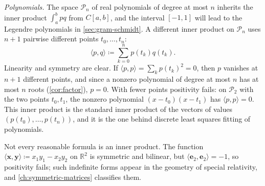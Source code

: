 \emph{Polynomials.} The space $\mathcal P_n$ of real polynomials of degree at most $n$ inherits the inner product $\int_a^bpq$ from $C[a,b]$, and the interval $[-1,1]$ will lead to the Legendre polynomials in \cref{sec:gram-schmidt}. A different inner product on $\mathcal P_n$ uses $n+1$ pairwise different points $t_0,\ldots,t_n$:
\[
\langle p,q\rangle\coloneqq\sum_{k=0}^np(t_k)q(t_k).
\]
Linearity and symmetry are clear. If $\langle p,p\rangle=\sum_kp(t_k)^2=0$, then $p$ vanishes at $n+1$ different points, and since a nonzero polynomial of degree at most $n$ has at most $n$ roots (\cref{cor:factor}), $p=0$. With fewer points positivity fails: on $\mathcal P_2$ with the two points $t_0,t_1$, the nonzero polynomial $(x-t_0)(x-t_1)$ has $\langle p,p\rangle=0$. This inner product is the standard inner product of the vectors of values $(p(t_0),\ldots,p(t_n))$, and it is the one behind discrete least squares fitting of polynomials.

Not every reasonable formula is an inner product. The function $\langle\mathbf x,\mathbf y\rangle\coloneqq x_1y_1-x_2y_2$ on $\mathbb R^2$ is symmetric and bilinear, but $\langle\mathbf e_2,\mathbf e_2\rangle=-1$, so positivity fails; such indefinite forms appear in the geometry of special relativity, and \cref{ch:symmetric-matrices} classifies them.

\begin{table}
\end{table}

